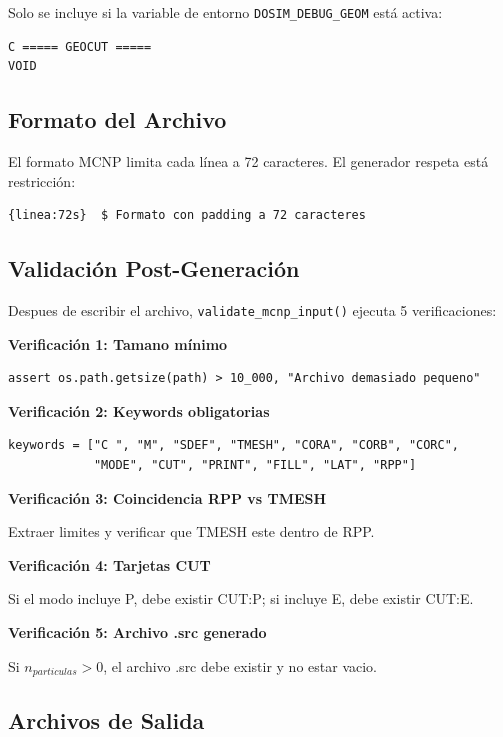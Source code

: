\documentclass[12pt,a4paper]{article}
\begin{document}
Solo se incluye si la variable de entorno \texttt{DOSIM\_DEBUG\_GEOM} está activa:

\begin{lstlisting}
C ===== GEOCUT =====
VOID
\end{lstlisting}

\subsection{Formato del Archivo}

El formato MCNP limita cada línea a 72 caracteres. El generador respeta está restricción:

\begin{lstlisting}
{linea:72s}  $ Formato con padding a 72 caracteres
\end{lstlisting}

\subsection{Validación Post-Generación}

Despues de escribir el archivo, \texttt{validate\_mcnp\_input()} ejecuta 5 verificaciones:

\textbf{Verificación 1: Tamano mínimo}

\begin{lstlisting}
assert os.path.getsize(path) > 10_000, "Archivo demasiado pequeno"
\end{lstlisting}

\textbf{Verificación 2: Keywords obligatorias}

\begin{lstlisting}
keywords = ["C ", "M", "SDEF", "TMESH", "CORA", "CORB", "CORC",
            "MODE", "CUT", "PRINT", "FILL", "LAT", "RPP"]
\end{lstlisting}

\textbf{Verificación 3: Coincidencia RPP vs TMESH}

Extraer limites y verificar que TMESH este dentro de RPP.

\textbf{Verificación 4: Tarjetas CUT}

Si el modo incluye P, debe existir CUT:P; si incluye E, debe existir CUT:E.

\textbf{Verificación 5: Archivo .src generado}

Si $n_{particulas} > 0$, el archivo .src debe existir y no estar vacio.

\subsection{Archivos de Salida}
\end{document}
